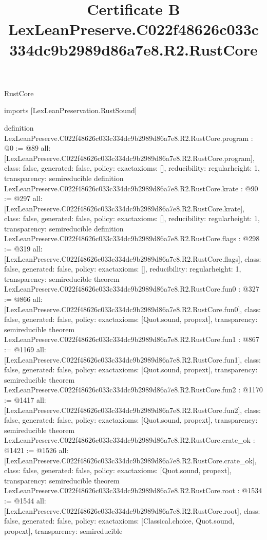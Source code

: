 \begin{lexlean}{RustCore}
\title{Certificate B LexLeanPreserve.C022f48626c033c334dc9b2989d86a7e8.R2.RustCore}
\begin{coremodule}
imports [LexLeanPreservation.RustSound]

definition LexLeanPreserve.C022f48626c033c334dc9b2989d86a7e8.R2.RustCore.program : @0 := @89 {
  all: [LexLeanPreserve.C022f48626c033c334dc9b2989d86a7e8.R2.RustCore.program],
  class: false,
  generated: false,
  policy: exact{axioms: []},
  reducibility: regular{height: 1},
  transparency: semireducible
}
definition LexLeanPreserve.C022f48626c033c334dc9b2989d86a7e8.R2.RustCore.krate : @90 := @297 {
  all: [LexLeanPreserve.C022f48626c033c334dc9b2989d86a7e8.R2.RustCore.krate],
  class: false,
  generated: false,
  policy: exact{axioms: []},
  reducibility: regular{height: 1},
  transparency: semireducible
}
definition LexLeanPreserve.C022f48626c033c334dc9b2989d86a7e8.R2.RustCore.flags : @298 := @319 {
  all: [LexLeanPreserve.C022f48626c033c334dc9b2989d86a7e8.R2.RustCore.flags],
  class: false,
  generated: false,
  policy: exact{axioms: []},
  reducibility: regular{height: 1},
  transparency: semireducible
}
theorem LexLeanPreserve.C022f48626c033c334dc9b2989d86a7e8.R2.RustCore.fun0 : @327 := @866 {
  all: [LexLeanPreserve.C022f48626c033c334dc9b2989d86a7e8.R2.RustCore.fun0],
  class: false,
  generated: false,
  policy: exact{axioms: [Quot.sound, propext]},
  transparency: semireducible
}
theorem LexLeanPreserve.C022f48626c033c334dc9b2989d86a7e8.R2.RustCore.fun1 : @867 := @1169 {
  all: [LexLeanPreserve.C022f48626c033c334dc9b2989d86a7e8.R2.RustCore.fun1],
  class: false,
  generated: false,
  policy: exact{axioms: [Quot.sound, propext]},
  transparency: semireducible
}
theorem LexLeanPreserve.C022f48626c033c334dc9b2989d86a7e8.R2.RustCore.fun2 : @1170 := @1417 {
  all: [LexLeanPreserve.C022f48626c033c334dc9b2989d86a7e8.R2.RustCore.fun2],
  class: false,
  generated: false,
  policy: exact{axioms: [Quot.sound, propext]},
  transparency: semireducible
}
theorem LexLeanPreserve.C022f48626c033c334dc9b2989d86a7e8.R2.RustCore.crate_ok : @1421 := @1526 {
  all: [LexLeanPreserve.C022f48626c033c334dc9b2989d86a7e8.R2.RustCore.crate_ok],
  class: false,
  generated: false,
  policy: exact{axioms: [Quot.sound, propext]},
  transparency: semireducible
}
theorem LexLeanPreserve.C022f48626c033c334dc9b2989d86a7e8.R2.RustCore.root : @1534 := @1544 {
  all: [LexLeanPreserve.C022f48626c033c334dc9b2989d86a7e8.R2.RustCore.root],
  class: false,
  generated: false,
  policy: exact{axioms: [Classical.choice, Quot.sound, propext]},
  transparency: semireducible
}


\end{coremodule}
\end{lexlean}
